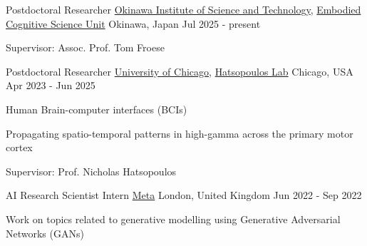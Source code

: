 

\begin{cventries}


\cventry
{Postdoctoral Researcher} %
{\href{https://www.oist.jp/}{Okinawa Institute of Science and Technology}, \href{https://www.oist.jp/research/research-units/ecsu}{Embodied Cognitive Science Unit}} %
{Okinawa, Japan} %
{Jul 2025 - present} %
{
	\begin{cvitems} %
		\item {Supervisor: Assoc. Prof. Tom Froese}
	\end{cvitems}
}

\cventry
{Postdoctoral Researcher} %
{\href{https://www.uchicago.edu}{University of Chicago}, \href{https://hatsopouloslab.uchicago.edu}{Hatsopoulos Lab}} %
{Chicago, USA} %
{Apr 2023 - Jun 2025} %
{
	\begin{cvitems} %
		\item {Human Brain-computer interfaces (BCIs)}
		\item {Propagating spatio-temporal patterns in high-gamma across the primary motor cortex}
		\item {Supervisor: Prof. Nicholas Hatsopoulos}
	\end{cvitems}
}

  \cventry
    {AI Research Scientist Intern} %
    {\href{https://about.facebook.com}{Meta}} %
    {London, United Kingdom} %
    {Jun 2022 - Sep 2022} %
    {
      \begin{cvitems} %
        \item {Work on topics related to generative modelling using Generative Adversarial Networks (GANs)}
      \end{cvitems}
    }


\end{cventries}
